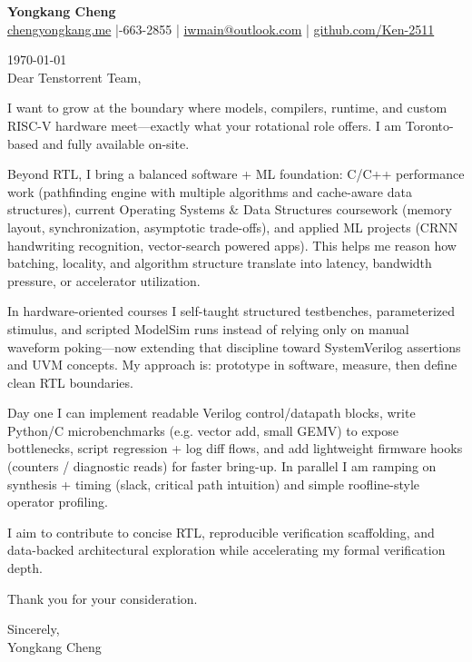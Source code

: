 \documentclass[11pt]{article}
\begin{document}
{\Large \textbf{Yongkang Cheng}}\\[2pt]
\href{https://chengyongkang.me/}{chengyongkang.me} \;|-663-2855 \;|\; \href{mailto:iwmain@outlook.com}{iwmain@outlook.com} \;|\; \href{https://github.com/Ken-2511}{github.com/Ken-2511}

\today\\[0.9em]

Dear Tenstorrent Team,

I want to grow at the boundary where models, compilers, runtime, and custom RISC-V hardware meet—exactly what your rotational role offers. I am Toronto-based and fully available on-site.

Beyond RTL, I bring a balanced software + ML foundation: C/C++ performance work (pathfinding engine with multiple algorithms and cache-aware data structures), current Operating Systems \& Data Structures coursework (memory layout, synchronization, asymptotic trade-offs), and applied ML projects (CRNN handwriting recognition, vector-search powered apps). This helps me reason how batching, locality, and algorithm structure translate into latency, bandwidth pressure, or accelerator utilization.

In hardware-oriented courses I self-taught structured testbenches, parameterized stimulus, and scripted ModelSim runs instead of relying only on manual waveform poking—now extending that discipline toward SystemVerilog assertions and UVM concepts. My approach is: prototype in software, measure, then define clean RTL boundaries.

Day one I can implement readable Verilog control/datapath blocks, write Python/C microbenchmarks (e.g. vector add, small GEMV) to expose bottlenecks, script regression + log diff flows, and add lightweight firmware hooks (counters / diagnostic reads) for faster bring-up. In parallel I am ramping on synthesis + timing (slack, critical path intuition) and simple roofline-style operator profiling.

I aim to contribute to concise RTL, reproducible verification scaffolding, and data-backed architectural exploration while accelerating my formal verification depth.

Thank you for your consideration.

\vspace{1em}
Sincerely,\\[1.2em]
Yongkang Cheng
\end{document}
